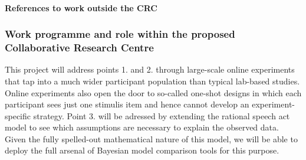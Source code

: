 \documentclass[11pt]{article}
\begin{document}
% 

\paragraph{References to work outside the CRC}


\printbibliography[heading=none,notkeyword={TMJT-own},notkeyword={TMJT-own-other}]

\subsubsection{Work programme and role within the proposed Collaborative Research Centre}

%
%
%
%
%
%
%
%
%
%
%

This project will address points 1. and 2. through large-scale online experiments that tap into a much wider participant population than typical lab-based studies.  Online experiments also open the door to so-called one-shot designs in which each participant sees just one stimulis item and hence cannot develop an experiment-specific strategy.  Point 3. will be adressed by extending the rational speech act model to see which assumptions are necessary to explain the observed data.  Given the fully spelled-out mathematical nature of this model, we will be able to deploy the full arsenal of Bayesian model comparison tools for this purpose.
\end{document}

